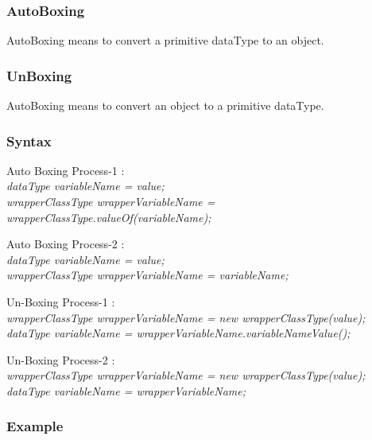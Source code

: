 \documentclass[openany]{book}  %
\begin{document}
\subsubsection{AutoBoxing}
AutoBoxing means to convert a primitive dataType to an object.
% 
% 
\subsubsection{UnBoxing}
AutoBoxing means to convert an object to a primitive dataType.
% 
% 
\subsubsection{Syntax}
\begin{center}
    \tt{
        \raggedright{Auto Boxing Process-1 : \\}
        \textit{
            dataType variableName = value;\\
            wrapperClassType wrapperVariableName = wrapperClassType.valueOf(variableName);\\
        }
        \newpage
        \raggedright{Auto Boxing Process-2 : \\}
        \textit{
            dataType variableName = value;\\
            wrapperClassType wrapperVariableName = variableName;\\
        }
        \vskip 0.5cm
        \raggedright{Un-Boxing Process-1 : \\}
        \textit{
            wrapperClassType wrapperVariableName = new wrapperClassType(value);
            dataType variableName = wrapperVariableName.variableNameValue();
        }
        \vskip 0.5cm
        \raggedright{Un-Boxing Process-2 : \\}
        \textit{
            wrapperClassType wrapperVariableName = new wrapperClassType(value);
            dataType variableName = wrapperVariableName;
        }
    }
\end{center}
% 
% 
\subsubsection{Example}
\end{document}
